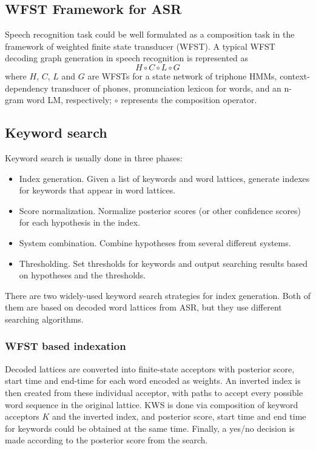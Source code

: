 \documentclass[journal]{IEEEtran}
\begin{document}
\subsection{WFST Framework for ASR}
Speech recognition task could be well formulated as a composition task in the framework of weighted finite state 
transducer (WFST). A typical WFST decoding graph generation in speech recognition\cite{mohri2008speech} is 
represented as
\begin{equation}
H \circ C \circ L \circ G
\end{equation}
where $H$, $C$, $L$ and $G$ are WFSTs for a state network of triphone HMMs, context-dependency 
transducer of phones, pronunciation lexicon for words, and an n-gram word LM, respectively; 
$\circ$ represents the composition operator.

\subsection{Keyword search}
Keyword search is usually done in three phases:
\begin{itemize}
\item Index generation. Given a list of keywords and word lattices, generate indexes for keywords that appear
in word lattices.
\item Score normalization. Normalize posterior scores (or other confidence scores) for each hypothesis
in the index.
\item System combination. Combine hypotheses from several different systems.
\item Thresholding. Set thresholds for keywords and output searching results based on hypotheses and the thresholds.
\end{itemize}

There are two widely-used keyword search strategies for index generation. Both of them are based on decoded word
lattices from ASR, but they use different searching algorithms.

\subsubsection{WFST based indexation}
Decoded lattices are converted into finite-state acceptors with posterior score, start time and end-time for 
each word encoded as weights. An inverted index is then created from these individual acceptor, with paths to
accept every possible word sequence in the original lattice. KWS is done via composition of keyword acceptors $K$
and the inverted index, and posterior score, start time and end time for keywords could be obtained at the same
time. Finally, a yes/no decision is made according to the posterior score from the search.
\end{document}
